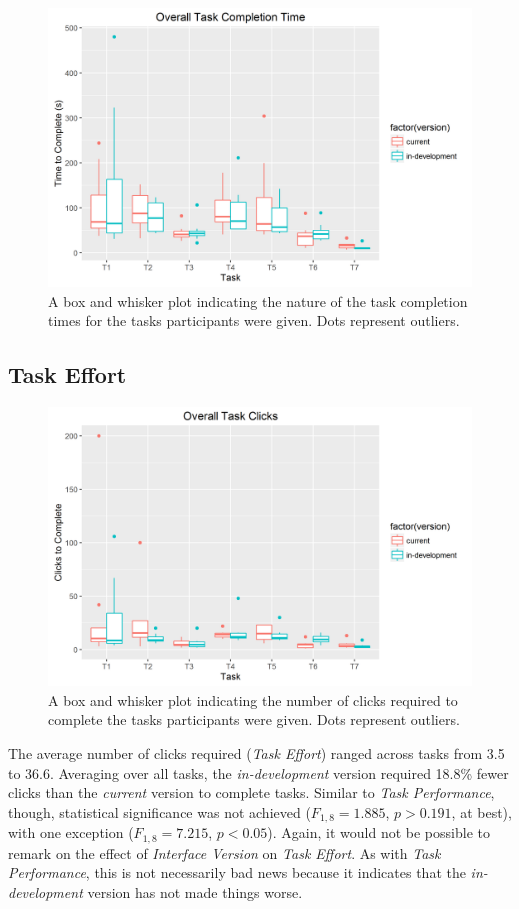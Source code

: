 \documentclass{acm_proc_article-sp}
\begin{document}
\begin{figure}[h!]
  \centering
  \includegraphics[width=.8\linewidth]{overall_task_completion}
  \caption{A box and whisker plot indicating the nature of the task completion times for the tasks participants were given. Dots represent outliers.}
  \label{fig:boxplot_task_time}
\end{figure}

%
\subsection{Task Effort}
\begin{figure}[h!]
  \centering
  \includegraphics[width=.8\linewidth]{overall_task_clicks}
  \caption{A box and whisker plot indicating the number of clicks required to complete the tasks participants were given. Dots represent outliers.}
  \label{fig:boxplot_avg_clicks}
\end{figure}

The average number of clicks required (\emph{Task Effort}) ranged across tasks from 3.5 to 36.6. Averaging over all tasks, the \emph{in-development} version required 18.8\% fewer clicks than the \emph{current} version to complete tasks. Similar to \emph{Task Performance}, though, statistical significance was not achieved ($F_{1,8} = 1.885$, $p > 0.191$, at best), with one exception ($F_{1,8} = 7.215$, $p < 0.05$). Again, it would not be possible to remark on the effect of \emph{Interface Version} on \emph{Task Effort}. As with \emph{Task Performance}, this is not necessarily bad news because it indicates that the \emph{in-development} version has not made things worse.
\end{document}
